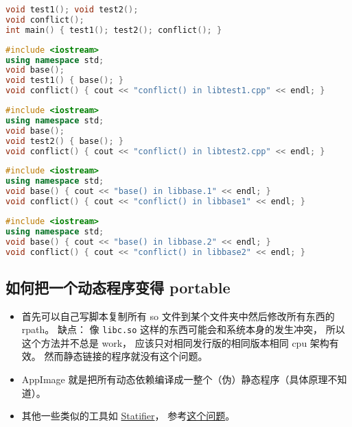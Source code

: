 \begin{lstlisting}[language=cpp, caption=main.cpp]
void test1(); void test2();
void conflict();
int main() { test1(); test2(); conflict(); }
\end{lstlisting}

\begin{lstlisting}[language=cpp, caption=libtest1.cpp]
#include <iostream>
using namespace std;
void base();
void test1() { base(); }
void conflict() { cout << "conflict() in libtest1.cpp" << endl; }
\end{lstlisting}

\begin{lstlisting}[language=cpp, caption=libtest2.cpp]
#include <iostream>
using namespace std;
void base();
void test2() { base(); }
void conflict() { cout << "conflict() in libtest2.cpp" << endl; }
\end{lstlisting}

\begin{lstlisting}[language=cpp, caption=libtest1.cpp]
#include <iostream>
using namespace std;
void base() { cout << "base() in libbase.1" << endl; }
void conflict() { cout << "conflict() in libbase1" << endl; }
\end{lstlisting}

\begin{lstlisting}[language=cpp, caption=libtest2.cpp]
#include <iostream>
using namespace std;
void base() { cout << "base() in libbase.2" << endl; }
void conflict() { cout << "conflict() in libbase2" << endl; }
\end{lstlisting}

\subsection{如何把一个动态程序变得 portable}
\begin{itemize}
\item 首先可以自己写脚本复制所有 so 文件到某个文件夹中然后修改所有东西的 rpath。 缺点： 像 \verb`libc.so` 这样的东西可能会和系统本身的发生冲突， 所以这个方法并不总是 work， 应该只对相同发行版的相同版本相同 cpu 架构有效。 然而静态链接的程序就没有这个问题。
\item AppImage 就是把所有动态依赖编译成一整个（伪）静态程序（具体原理不知道）。
\item 其他一些类似的工具如 \href{https://statifier.sourceforge.net/}{Statifier}， 参考\href{https://askubuntu.com/questions/537479/is-there-any-open-source-way-to-make-a-static-from-a-dynamic-executable-with-no}{这个问题}。
\end{itemize}
